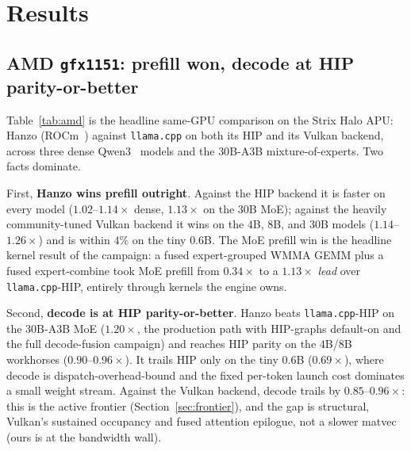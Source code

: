 \documentclass[11pt]{article}
\begin{document}
\section{Results}
\label{sec:results}

\subsection{AMD \texttt{gfx1151}: prefill won, decode at HIP parity-or-better}
\label{sec:amd}

Table~\ref{tab:amd} is the headline same-GPU comparison on the Strix Halo APU: Hanzo
(ROCm~\cite{rocm2024}) against \texttt{llama.cpp} on both its HIP and its Vulkan backend, across three
dense Qwen3~\cite{qwen3} models and the $30$B-A3B mixture-of-experts. Two facts dominate.

First, \textbf{Hanzo wins prefill outright}. Against the HIP backend it is faster on every model
($1.02$--$1.14\times$ dense, $1.13\times$ on the $30$B MoE); against the heavily community-tuned
Vulkan backend it wins on the $4$B, $8$B, and $30$B models ($1.14$--$1.26\times$) and is within
$4\%$ on the tiny $0.6$B. The MoE prefill win is the headline kernel result of the campaign: a
fused expert-grouped WMMA GEMM plus a fused expert-combine took MoE prefill from $0.34\times$ to a
$1.13\times$ \emph{lead} over \texttt{llama.cpp}-HIP, entirely through kernels the engine owns.

Second, \textbf{decode is at HIP parity-or-better}. Hanzo beats \texttt{llama.cpp}-HIP on the
$30$B-A3B MoE ($1.20\times$, the production path with HIP-graphs default-on and the full decode-fusion
campaign) and reaches HIP parity on the $4$B/$8$B workhorses ($0.90$--$0.96\times$). It trails HIP
only on the tiny $0.6$B ($0.69\times$), where decode is dispatch-overhead-bound and the fixed
per-token launch cost dominates a small weight stream. Against the Vulkan backend, decode trails by
$0.85$--$0.96\times$: this is the active frontier (Section~\ref{sec:frontier}), and the gap is
structural, Vulkan's sustained occupancy and fused attention epilogue, not a slower matvec (ours is
at the bandwidth wall).
\end{document}
